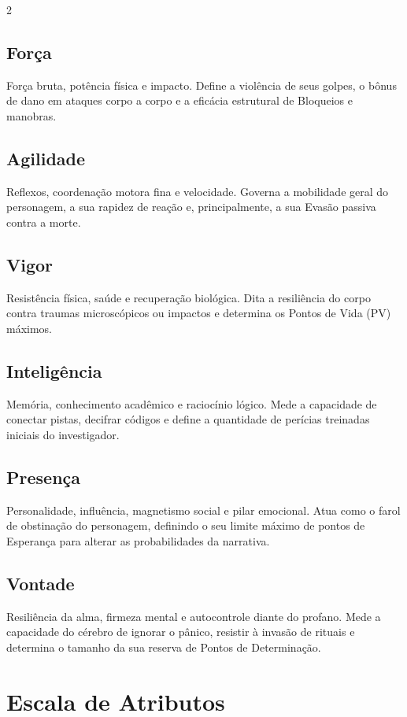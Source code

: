 \documentclass[a4paper,11pt,openany]{book}
\begin{document}
\begin{multicols}{2}
\subsection{Força}
Força bruta, potência física e impacto. Define a violência de seus golpes, o bônus de dano em ataques corpo a corpo e a eficácia estrutural de Bloqueios e manobras.

\subsection{Agilidade}
Reflexos, coordenação motora fina e velocidade. Governa a mobilidade geral do personagem, a sua rapidez de reação e, principalmente, a sua Evasão passiva contra a morte.

\subsection{Vigor}
Resistência física, saúde e recuperação biológica. Dita a resiliência do corpo contra traumas microscópicos ou impactos e determina os Pontos de Vida (PV) máximos.

\subsection{Inteligência}
Memória, conhecimento acadêmico e raciocínio lógico. Mede a capacidade de conectar pistas, decifrar códigos e define a quantidade de perícias treinadas iniciais do investigador.

\subsection{Presença}
Personalidade, influência, magnetismo social e pilar emocional. Atua como o farol de obstinação do personagem, definindo o seu limite máximo de pontos de Esperança para alterar as probabilidades da narrativa.

\subsection{Vontade}
Resiliência da alma, firmeza mental e autocontrole diante do profano. Mede a capacidade do cérebro de ignorar o pânico, resistir à invasão de rituais e determina o tamanho da sua reserva de Pontos de Determinação.
\section{Escala de Atributos}


\end{multicols}
\end{document}
